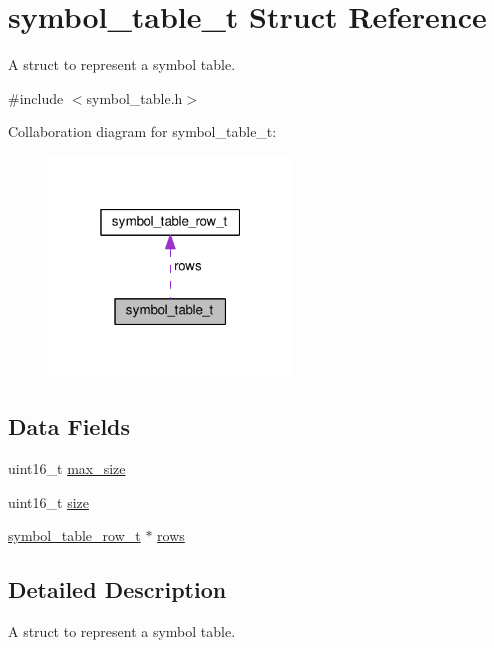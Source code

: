 \hypertarget{structsymbol__table__t}{}\section{symbol\+\_\+table\+\_\+t Struct Reference}
\label{structsymbol__table__t}


A struct to represent a symbol table.  




{\ttfamily \#include $<$symbol\+\_\+table.\+h$>$}



Collaboration diagram for symbol\+\_\+table\+\_\+t\+:
\nopagebreak
\begin{figure}[H]
\begin{center}
\leavevmode
\includegraphics[width=184pt]{structsymbol__table__t__coll__graph}
\end{center}
\end{figure}
\subsection*{Data Fields}
\begin{DoxyCompactItemize}
\item 
uint16\+\_\+t \hyperlink{structsymbol__table__t_ab237aa4717eabb6db3618c1626cf4286}{max\+\_\+size}
\item 
uint16\+\_\+t \hyperlink{structsymbol__table__t_a2e4ac803ab5c1afc3a1042e46b08a508}{size}
\item 
\hyperlink{structsymbol__table__row__t}{symbol\+\_\+table\+\_\+row\+\_\+t} $\ast$ \hyperlink{structsymbol__table__t_a6e9f4ff5f1fea234f178daa5f1e120e3}{rows}
\end{DoxyCompactItemize}


\subsection{Detailed Description}
A struct to represent a symbol table. 

